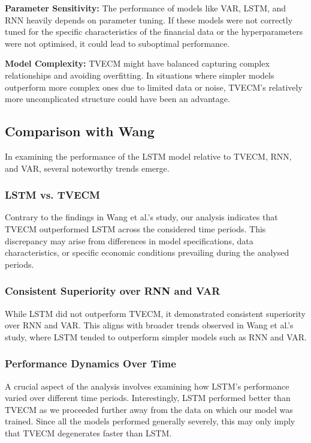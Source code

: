 \documentclass[a4paper,10pt]{article}
\begin{document}
\textbf{Parameter Sensitivity:} The performance of models like VAR, LSTM, and RNN heavily depends on parameter tuning. If these models were not correctly tuned for the specific characteristics of the financial data or the hyperparameters were not optimised, it could lead to suboptimal performance.

\textbf{Model Complexity:} TVECM might have balanced capturing complex relationships and avoiding overfitting. In situations where simpler models outperform more complex ones due to limited data or noise, TVECM's relatively more uncomplicated structure could have been an advantage.

\subsection{Comparison with Wang}

In examining the performance of the LSTM model relative to TVECM, RNN, and VAR, several noteworthy trends emerge. 

\subsubsection{LSTM vs. TVECM}

Contrary to the findings in Wang et al.'s study, our analysis indicates that TVECM outperformed LSTM across the considered time periods. This discrepancy may arise from differences in model specifications, data characteristics, or specific economic conditions prevailing during the analysed periods.

\subsubsection{Consistent Superiority over RNN and VAR}

While LSTM did not outperform TVECM, it demonstrated consistent superiority over RNN and VAR. This aligns with broader trends observed in Wang et al.'s study, where LSTM tended to outperform simpler models such as RNN and VAR.

\subsubsection{Performance Dynamics Over Time}

A crucial aspect of the analysis involves examining how LSTM's performance varied over different time periods. Interestingly, LSTM performed better than TVECM as we proceeded further away from the data on which our model was trained. Since all the models performed generally severely, this may only imply that TVECM degenerates faster than LSTM.
\end{document}
